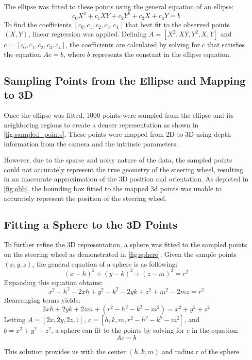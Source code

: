 The ellipse was fitted to these points using the general equation of an ellipse:
\[
c_0 X^2 + c_1 XY + c_2 Y^2 + c_3 X + c_4 Y = b
\]
To find the coefficients \([c_0, c_1, c_2, c_3, c_4]\) 
that best fit to the observed points \((X, Y)\), linear 
regression was applied. Defining \( A = [X^2, XY, Y^2, X, Y] \) and 
\( c = [c_0, c_1, c_2, c_3, c_4] \), the coefficients are calculated 
by solving for \( c \) that satisfies the equation \( Ac = b \), 
where \( b \) represents the constant in the ellipse equation. 


\subsection{Sampling Points from the Ellipse and Mapping to 3D}
Once the ellipse was fitted, 1000 points were sampled from 
the ellipse and its neighboring regions to create a denser 
representation as shown in \cref{fig:sampled_points}. These points were mapped from 2D to 3D using 
depth information from the camera and the intrinsic parameters.

However, due to the sparse and noisy nature of the data, 
the sampled points could not accurately represent the true 
geometry of the steering wheel, resulting in an inaccurate 
approximation of the 3D position and orientation. 
As depicted in \cref{fig:obb}, the bounding box fitted to the 
mapped 3d points was unable to accurately represent the 
position of the steering wheel.

\subsection{Fitting a Sphere to the 3D Points}
To further refine the 3D representation, a sphere was fitted to the sampled points on the steering wheel as demonstrated in
\cref{fig:sphere}. 
Given the sample points \((x, y, z)\), the general 
equation of a sphere is as following:
\[
(x - h)^2 + (y - k)^2 + (z - m)^2 = r^2
\]
Expanding this equation obtains:
\[
x^2 + h^2 - 2xh + y^2 + k^2 - 2yk + z^2 + m^2 - 2mz = r^2
\]
Rearranging terms yields:
\[
2xh + 2yk + 2zm + (r^2 - h^2 - k^2 - m^2) = x^2 + y^2 + z^2
\]
Letting \( A = [2x, 2y, 2z, 1] \), \( c = [h, k, m, r^2 - h^2 - k^2 - m^2] \), and 
\( b = x^2 + y^2 + z^2 \), a sphere can fit to the points by solving for \( c \) in the equation:
\[
Ac = b
\]

This solution provides us with the center \((h, k, m)\) and radius 
\(r\) of the sphere.


